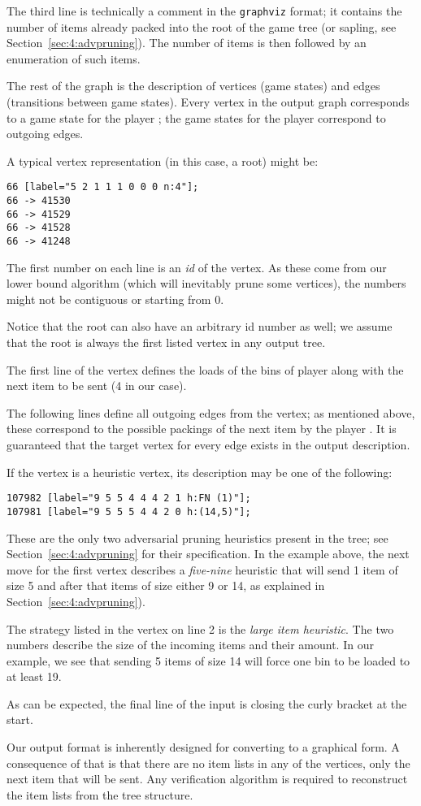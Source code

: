 The third line is technically a comment in the \texttt{graphviz}
format; it contains the number of items already packed into the root
of the game tree (or sapling, see Section~\ref{sec:4:advpruning}).  The
number of items is then followed by an enumeration of such items.

The rest of the graph is the description of vertices (game states) and
edges (transitions between game states). Every vertex in the output
graph corresponds to a game state for the player \adversary; the game
states for the player \algo correspond to outgoing edges.

A typical vertex representation (in this case, a root) might be:

\begin{lstlisting}
66 [label="5 2 1 1 1 0 0 0 n:4"];
66 -> 41530
66 -> 41529
66 -> 41528
66 -> 41248
\end{lstlisting}

The first number on each line is an \emph{id} of the vertex. As these
come from our lower bound algorithm (which will inevitably prune some
vertices), the numbers might not be contiguous or starting from
0.

Notice that the root can also have an arbitrary id number as well; we
assume that the root is always the first listed vertex in any output
tree.

The first line of the vertex defines the loads of the bins of player
\algo along with the next item to be sent (4 in our case).

The following lines define all outgoing edges from the vertex; as
mentioned above, these correspond to the possible packings of the next
item by the player \algo. It is guaranteed that the target vertex for
every edge exists in the output description.

If the vertex is a heuristic vertex, its description may be one of the
following:

\begin{lstlisting}
107982 [label="9 5 5 4 4 4 2 1 h:FN (1)"];
107981 [label="9 5 5 5 4 4 2 0 h:(14,5)"];
\end{lstlisting}

These are the only two adversarial pruning heuristics present in the
tree; see Section~\ref{sec:4:advpruning} for their specification. In
the example above, the next move for the first vertex describes a
\emph{five-nine} heuristic that will send 1 item of size 5 and after
that items of size either 9 or 14, as explained in
Section~\ref{sec:4:advpruning}).

The strategy listed in the vertex on line 2 is the \emph{large item
heuristic}.  The two numbers describe the size of the incoming items
and their amount. In our example, we see that sending 5 items of size
14 will force one bin to be loaded to at least 19.

As can be expected, the final line of the input is closing the curly
bracket at the start.

Our output format is inherently designed for converting to a graphical
form. A consequence of that is that there are no item lists in any of
the vertices, only the next item that will be sent. Any verification
algorithm is required to reconstruct the item lists from the tree
structure.